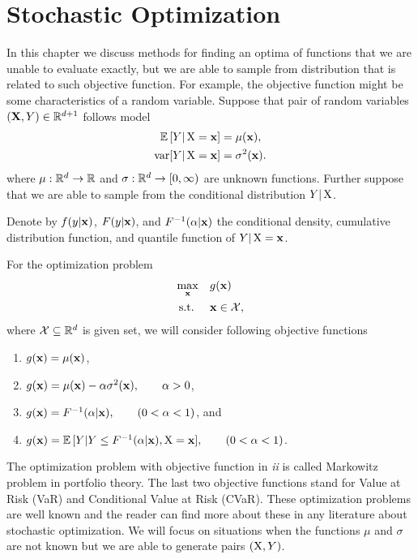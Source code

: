 \chapter{Stochastic Optimization}

In this chapter we discuss methods for finding an optima of functions that we are unable to evaluate exactly, but we are able to sample from distribution that is related to such objective function. For example, the objective function might be some characteristics of a random variable. Suppose that pair of random variables $(\mathbf{X}, Y) \in \mathbb{R}^{d+1}$ follows model
\begin{equation*}
	\begin{aligned}
		\operatorname{\mathbb{E}\,} [ Y \vert \operatorname{\bm{X}} = \mathbf{x} ] & = \mu (\mathbf{x}), \\
		\operatorname{\textrm{var}} [ Y \vert \operatorname{\bm{X}} = \mathbf{x} ] & = \sigma^2 (\mathbf{x}).
	\end{aligned}
\end{equation*}
where $\mu: \mathbb{R}^d \to \mathbb{R}$ and $\sigma: \mathbb{R}^d \to [0, \infty)$ are unknown functions. Further suppose that we are able to sample from the conditional distribution $Y \vert \operatorname{\bm{X}}$.

Denote by $f (y \vert \mathbf{x})$, $F (y \vert \mathbf{x})$, and $F^{-1} (\alpha \vert \mathbf{x})$ the conditional density, cumulative distribution function, and quantile function of $Y \vert \operatorname{\bm{X}} = \mathbf{x}$.

For the optimization problem
\begin{equation}
	\label{eq:origMax}
	\begin{aligned}
		& \underset{\mathbf{x}}{\max} & & g (\mathbf{x}) \\
		& \operatorname{\textrm{s.t.}} & & \mathbf{x} \in \mathcal{X},
	\end{aligned}
\end{equation}
where $\mathcal{X} \subseteq \mathbb{R}^d$ is given set, we will consider following objective functions
\begin{enumerate}[\itshape i)]
	\item $g (\mathbf{x}) = \mu (\mathbf{x})$,
	\item $g (\mathbf{x}) = \mu (\mathbf{x}) - \alpha \sigma^2  (\mathbf{x}), \qquad \alpha > 0$,
	\item $g (\mathbf{x}) = F^{-1} (\alpha \vert \mathbf{x}), \qquad (0 < \alpha < 1)$, and
	\item $g (\mathbf{x}) = \operatorname{\mathbb{E}\,} [Y \vert Y \leq F^{-1} (\alpha \vert \mathbf{x}), \operatorname{\bm{X}} = \mathbf{x} ], \qquad (0 < \alpha < 1)$.
\end{enumerate}

The optimization problem with objective function in \emph{ii} is called Markowitz problem in portfolio theory. The last two objective functions stand for Value at Risk (VaR) and Conditional Value at Risk (CVaR). These optimization problems are well known and the reader can find more about these in any literature about stochastic optimization. We will focus on situations when the functions $\mu$ and $\sigma$ are not known but we are able to generate pairs $(\operatorname{\bm{X}}, Y)$.

